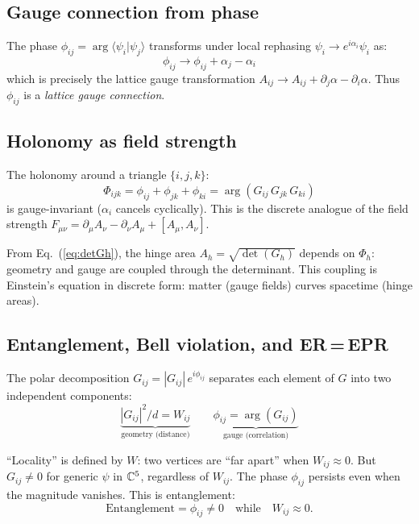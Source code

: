\subsection{Gauge connection from phase}
\label{sec:gauge_connection}

The phase $\phi_{ij} = \arg\langle\psi_i|\psi_j\rangle$ transforms under local rephasing $\psi_i \to e^{i\alpha_i}\psi_i$ as:
\begin{equation}
\phi_{ij} \to \phi_{ij} + \alpha_j - \alpha_i
\end{equation}
which is precisely the lattice gauge transformation $A_{ij} \to A_{ij} + \partial_j\alpha - \partial_i\alpha$. Thus $\phi_{ij}$ is a \emph{lattice gauge connection}.

\subsection{Holonomy as field strength}
\label{sec:holonomy}

The holonomy around a triangle $\{i, j, k\}$:
\begin{equation}
\Phi_{ijk} = \phi_{ij} + \phi_{jk} + \phi_{ki} = \arg(G_{ij}\,G_{jk}\,G_{ki})
\end{equation}
is gauge-invariant ($\alpha_i$ cancels cyclically). This is the discrete analogue of the field strength $F_{\mu\nu} = \partial_\mu A_\nu - \partial_\nu A_\mu + [A_\mu, A_\nu]$.

From Eq.~(\ref{eq:detGh}), the hinge area $A_h = \sqrt{\det(G_h)}$ depends on $\Phi_h$: geometry and gauge are coupled through the determinant. This coupling is Einstein's equation in discrete form: matter (gauge fields) curves spacetime (hinge areas).

\subsection{Entanglement, Bell violation, and ER\,=\,EPR}

The polar decomposition $G_{ij} = |G_{ij}|\,e^{i\phi_{ij}}$ separates each element of $G$ into two independent components:
\begin{equation}
\underbrace{|G_{ij}|^2/d = W_{ij}}_{\text{geometry (distance)}} \qquad \underbrace{\phi_{ij} = \arg(G_{ij})}_{\text{gauge (correlation)}}
\end{equation}

``Locality'' is defined by $W$: two vertices are ``far apart'' when $W_{ij} \approx 0$. But $G_{ij} \neq 0$ for generic $\psi$ in $\mathbb{C}^5$, regardless of $W_{ij}$. The phase $\phi_{ij}$ persists even when the magnitude vanishes. This is entanglement:
\begin{equation}
\text{Entanglement} = \phi_{ij} \neq 0 \quad\text{while}\quad W_{ij} \approx 0.
\end{equation}


